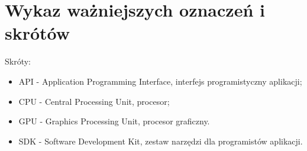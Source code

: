 \chapter*{Wykaz ważniejszych oznaczeń i skrótów}

Skróty:
\begin{itemize}
\item{API} - Application Programming Interface, interfejs programistyczny aplikacji;
\item{CPU} - Central Processing Unit, procesor;
\item{GPU} - Graphics Processing Unit, procesor graficzny.
\item{SDK} - Software Development Kit, zestaw narzędzi dla programistów aplikacji.
\end{itemize}